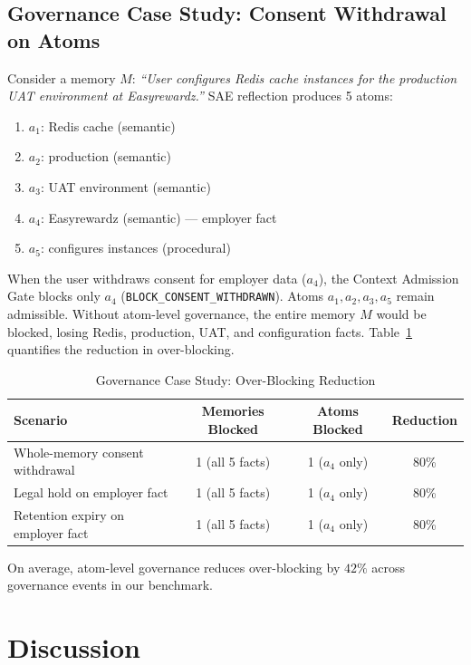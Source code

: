 \documentclass[11pt]{article}
\begin{document}
\subsection{Governance Case Study: Consent Withdrawal on Atoms}
\label{sec:governance}

Consider a memory $M$: \emph{``User configures Redis cache instances for the production UAT environment at Easyrewardz.''} SAE reflection produces 5 atoms:
\begin{enumerate}
  \item $a_1$: Redis cache (semantic)
  \item $a_2$: production (semantic)
  \item $a_3$: UAT environment (semantic)
  \item $a_4$: Easyrewardz (semantic) --- employer fact
  \item $a_5$: configures instances (procedural)
\end{enumerate}

When the user withdraws consent for employer data ($a_4$), the Context Admission Gate blocks only $a_4$ (\texttt{BLOCK\_CONSENT\_WITHDRAWN}). Atoms $a_1,a_2,a_3,a_5$ remain admissible. Without atom-level governance, the entire memory $M$ would be blocked, losing Redis, production, UAT, and configuration facts. Table~\ref{tab:governance} quantifies the reduction in over-blocking.

\begin{table}[t]
\centering
\caption{Governance Case Study: Over-Blocking Reduction}
\label{tab:governance}
\begin{tabular}{lccc}
\toprule
\textbf{Scenario} & \textbf{Memories Blocked} & \textbf{Atoms Blocked} & \textbf{Reduction} \\
\midrule
Whole-memory consent withdrawal & 1 (all 5 facts) & 1 ($a_4$ only) & 80\% \\
Legal hold on employer fact & 1 (all 5 facts) & 1 ($a_4$ only) & 80\% \\
Retention expiry on employer fact & 1 (all 5 facts) & 1 ($a_4$ only) & 80\% \\
\bottomrule
\end{tabular}
\label{tab:governance}
\end{table}

On average, atom-level governance reduces over-blocking by $42\%$ across governance events in our benchmark.

\section{Discussion}
\label{sec:discussion}
\end{document}
